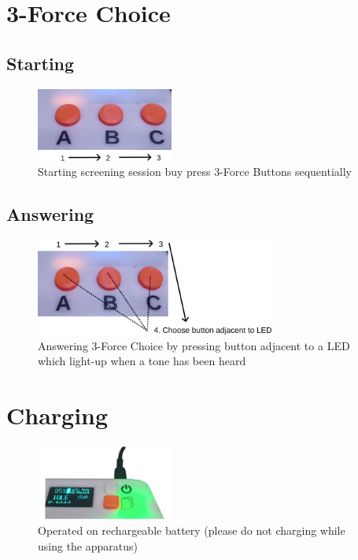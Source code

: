 \documentclass[a4paper,12pt,oneside,pdflatex,italian,final,twocolumn]{article}
\begin{document}
\newpage
\raggedright
\section{3-Force Choice}

\subsection{Starting}

\begin{figure} [h]
    \centering
    \includegraphics[width=0.4\textwidth,]{images/3fc_start.png}
    \caption{Starting screening session buy press 3-Force Buttons sequentially}
\end{figure}

\subsection{Answering}

\begin{figure} [h]
    \centering
    \includegraphics[width=0.7\textwidth,]{images/3fc_answer.png}
    \caption{Answering 3-Force Choice by pressing button adjacent to a LED which light-up when a tone has been heard}
\end{figure}

\raggedright
\section{Charging}

\begin{figure} [h]
    \centering
    \includegraphics[width=0.4\textwidth,]{images/charging.png}
    \caption{Operated on rechargeable battery (please do not charging while using the apparatus)}
\end{figure}
\end{document}
